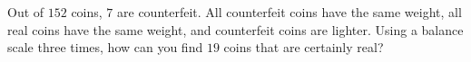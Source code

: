 Out of $152$ coins, $7$ are counterfeit. All counterfeit coins have the same weight, all real coins have the same weight, and counterfeit coins are lighter. Using a balance scale three times, how can you find $19$ coins that are certainly real?
